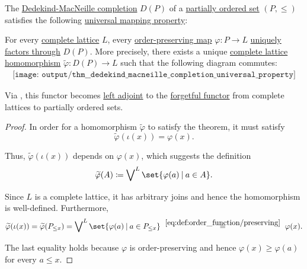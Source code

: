 \begin{theorem}\label{thm:dedekind_macneille_completion_universal_property}
  The \hyperref[def:dedekind_macnielle_completion]{Dedekind-MacNeille completion} \( D(P) \) of a \hyperref[def:partially_ordered_set]{partially ordered set} \( (P, \leq) \) satisfies the following \hyperref[rem:universal_mapping_property]{universal mapping property}:
  \begin{displayquote}
    For every \hyperref[def:lattice]{complete lattice} \( L \), every \hyperref[def:order_function/preserving]{order-preserving map} \( \varphi: P \to L \) \hyperref[def:factors_through]{uniquely factors through} \( D(P) \). More precisely, there exists a unique \hyperref[def:complete_lattice/homomorphism]{complete lattice homomorphism} \( \widetilde{\varphi}: D(P) \to L \) such that the following diagram commutes:
    \begin{equation}\label{eq:thm:dedekind_macneille_completion_universal_property/diagram}
      \begin{aligned}
        \texttt{[image: output/thm\_\_dedekind\_macneille\_completion\_universal\_property]}
      \end{aligned}
    \end{equation}
  \end{displayquote}
\end{theorem}
\begin{comments}
  \item Via , this functor becomes \hyperref[def:category_adjunction]{left adjoint} to the \hyperref[def:concrete_category]{forgetful functor} from complete lattices to partially ordered sets.
\end{comments}
\begin{proof}
  In order for a homomorphism \( \widetilde{\varphi} \) to satisfy the theorem, it must satisfy
  \begin{equation*}
    \widetilde{\varphi}(\iota(x)) = \varphi(x).
  \end{equation*}

  Thus, \( \widetilde{\varphi}(\iota(x)) \) depends on \( \varphi(x) \), which suggests the definition
  \begin{equation*}
    \widetilde{\varphi}(A) \coloneqq \bigvee\nolimits^L \set{ \varphi(a) \given a \in A }.
  \end{equation*}

  Since \( L \) is a complete lattice, it has arbitrary joins and hence the homomorphism is well-defined. Furthermore,
  \begin{equation*}
    \widetilde{\varphi}(\iota(x))
    =
    \widetilde{\varphi}(P_{\leq x})
    =
    \bigvee\nolimits^L \set{ \varphi(a) \given a \in P_{\leq x} }
    \reloset {\eqref{eq:def:order_function/preserving}} =
    \varphi(x).
  \end{equation*}

  The last equality holds because \( \varphi \) is order-preserving and hence \( \varphi(x) \geq \varphi(a) \) for every \( a \leq x \).
\end{proof}

